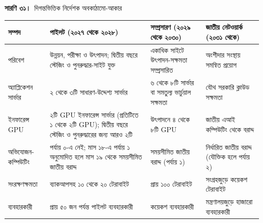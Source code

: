 \documentclass[border=10pt]{standalone}
\begin{document}
\begin{minipage}{17cm}
{\large\bfseries সারণি ৩১।}\ {\large দিগন্তভিত্তিক নির্দেশক অবকাঠামো-আকার}\par\vspace{7pt}
\small
{}
\begin{tabularx}{\linewidth}{@{}>{\hsize=0.828\hsize\raggedright\arraybackslash}X>{\hsize=1.057\hsize\raggedright\arraybackslash}X>{\hsize=1.057\hsize\raggedright\arraybackslash}X>{\hsize=1.057\hsize\raggedright\arraybackslash}X@{}}
\arrayrulecolor{bapilrule}\toprule
\rowcolor{white}\textbf{সম্পদ} & \textbf{পাইলট (২০২৭ থেকে ২০২৮)} & \textbf{সম্প্রসারণ (২০২৯ থেকে ২০৩০)} & \textbf{জাতীয় নেটওয়ার্ক (২০৩১ থেকে)} \\
\midrule
পরিবেশ & উন্নয়ন, পরীক্ষা ও উৎপাদন; দ্বিতীয় বছরে স্টেজিং ও পুনরুদ্ধার-সাইট যুক্ত & একাধিক সাইটে উৎপাদন-সক্ষমতা সম্প্রসারিত & অংশীদার সংস্থায় সমন্বিত প্রয়োগ \\
অ্যাপ্লিকেশন সার্ভার & ২ থেকে ৩টি সাধারণ-উদ্দেশ্য সার্ভার & ৬ থেকে ৮টি সার্ভার বা সমতুল্য ভার্চুয়াল সক্ষমতা & যৌথ সরকারি ক্লাউড সক্ষমতা \\
ইনফারেন্স GPU & ২টি GPU ইনফারেন্স সার্ভার (প্রতিটিতে ১ থেকে ২টি GPU); দ্বিতীয় বছরে স্টেজিং ও পুনরুদ্ধারের জন্য আরও ২টি & উৎপাদনে ৪ থেকে ৮টি GPU & জাতীয় এআই কম্পিউটিং থেকে বরাদ্দ \\
অভিযোজন-কম্পিউটিং & পর্যায় ০-এ নেই; মাস ১৮-এ পর্যায় ১ অনুমোদিত হলে মাস ১৯ থেকে সময়সীমিত জাতীয় বরাদ্দ & সময়সীমিত জাতীয় বরাদ্দ (পর্যায় ১) & নির্ধারিত জাতীয় বরাদ্দ (যৌক্তিক হলে পর্যায় ২) \\
সংরক্ষণক্ষমতা & ব্যাকআপসহ ১০ থেকে ২০ টেরাবাইট & প্রায় ১০০ টেরাবাইট & সংগ্রহজুড়ে কয়েকশ টেরাবাইট \\
ব্যবহারকারী & প্রায় ৫০ জন পর্যন্ত পাইলট ব্যবহারকারী & কয়েকশ ব্যবহারকারী & মন্ত্রণালয়জুড়ে হাজারো ব্যবহারকারী \\
\bottomrule
\end{tabularx}
\par\vspace{5pt}{\footnotesize\itshape ধাপ ০-এর সম্ভাব্যতা ও ব্যয়-নিরূপণ সমীক্ষার (অনুচ্ছেদ ১৫.১) পরিকল্পনা-অনুমান, ক্রয়-বিনির্দেশ নয়। পাইলট-কলাম বাজেটের যন্ত্রপাতির সঙ্গে সংগতিপূর্ণ (সারণি ৪৯)।}
\par{}
\end{minipage}
\end{document}
